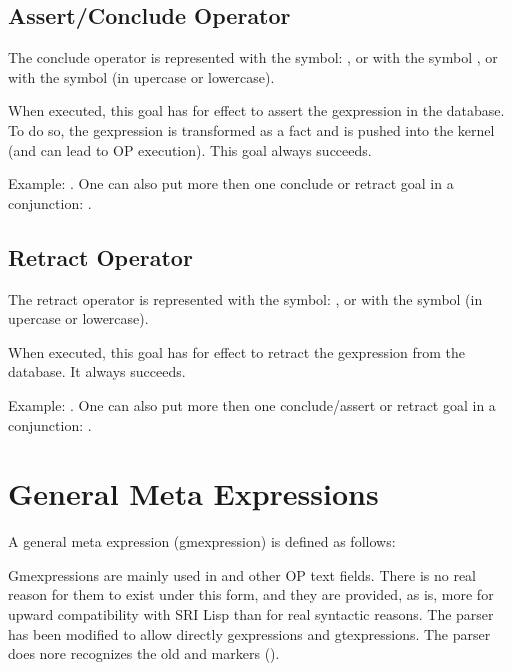 \subsection{Assert/Conclude Operator}

The conclude operator is represented with the symbol: \samp{=>}, or with the
symbol , or with the symbol  (in upercase or
lowercase).

When executed, this goal has for effect to assert the gexpression in the
database. To do so, the gexpression is transformed as a fact and is pushed
into the kernel (and can lead to OP execution). This goal always succeeds.

Example: . One can also put more then one
conclude or retract goal in a conjunction: .

\subsection{Retract Operator}

The retract operator is represented with the symbol: \samp{\~{}>}, or with the
symbol  (in upercase or lowercase).

When executed, this goal has for effect to retract the gexpression from the
database. It always succeeds.


Example: . One can also put more then one
conclude/assert or retract goal in a conjunction: .

\section{General Meta Expressions}

A general meta expression (gmexpression) is defined as follows:

Gmexpressions are mainly used in  and other OP text
fields. There is no real reason for them to exist under this form, and they are
provided, as is, more for upward compatibility with SRI Lisp \OPRS{} than for
real syntactic reasons. The parser has been modified to allow directly
gexpressions and gtexpressions. The parser does nore recognizes the old
 and  markers ().

